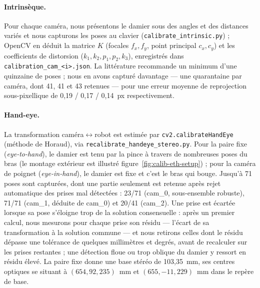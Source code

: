 \paragraph{Intrinsèque.} Pour chaque caméra, nous présentons le damier sous des angles et des distances variés et nous capturons les poses au clavier (\texttt{calibrate\_intrinsic.py}) ; OpenCV en déduit la matrice $K$ (focales $f_x,f_y$, point principal $c_x,c_y$) et les coefficients de distorsion ($k_1,k_2,p_1,p_2,k_3$), enregistrés dans \texttt{calibration\_cam\_<i>.json}. La littérature recommande un minimum d'une quinzaine de poses ; nous en avons capturé davantage --- une quarantaine par caméra, dont 41, 41 et 43 retenues --- pour une erreur moyenne de reprojection sous-pixellique de 0,19 / 0,17 / 0,14~px respectivement.

\paragraph{Hand-eye.} La transformation caméra$\leftrightarrow$robot est estimée par \texttt{cv2.calibrateHandEye} (méthode de Horaud), via \texttt{recalibrate\_handeye\_stereo.py}. Pour la paire fixe (\emph{eye-to-hand}), le damier est tenu par la pince à travers de nombreuses poses du bras (le montage extérieur est illustré figure~\ref{fig:calib-eth-setup}) ; pour la caméra de poignet (\emph{eye-in-hand}), le damier est fixe et c'est le bras qui bouge. Jusqu'à 71 poses sont capturées, dont une partie seulement est retenue après rejet automatique des prises mal détectées : 23/71 (cam\_0, sous-ensemble robuste), 71/71 (cam\_1, déduite de cam\_0) et 20/41 (cam\_2). Une prise est écartée lorsque sa pose s'éloigne trop de la solution consensuelle : après un premier calcul, nous mesurons pour chaque prise son résidu --- l'écart de sa transformation à la solution commune --- et nous retirons celles dont le résidu dépasse une tolérance de quelques millimètres et degrés, avant de recalculer sur les prises restantes ; une détection floue ou trop oblique du damier y ressort en résidu élevé. La paire fixe donne une base stéréo de 103,35~mm, ses centres optiques se situant à $(654, 92, 235)$~mm et $(655, -11, 229)$~mm dans le repère de base.

